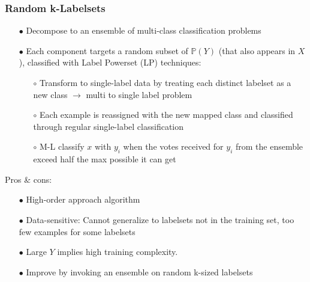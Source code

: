 \documentclass{beamer}
\begin{document}
\begin{frame}
\frametitle{Random k-Labelsets}
\begin{itemize}
\item[$\bullet$] Decompose to an ensemble of multi-class classification problems
\item[$\bullet$] Each component targets a random subset of $\mathbb{P}(Y)$ (that
  also appears in $X$), classified with Label Powerset (LP) techniques:
\begin{itemize}
\item[$\circ$] Transform to single-label data by treating each distinct labelset
  as a new class $\rightarrow$ multi to single label problem
\item[$\circ$] Each example is reassigned with the new mapped class and classified through regular single-label classification
\item[$\circ$] M-L classify $x$ with $y_i$ when the votes received for $y_i$ from the ensemble exceed half the max possible it can get
\end{itemize}
\end{itemize}
Pros \& cons:
\begin{itemize}
\item[$\bullet$] High-order approach algorithm
\item[$\bullet$] Data-sensitive: Cannot generalize to labelsets not in the training set, too few examples for some labelsets
\item[$\bullet$] Large $Y$ implies high training complexity.
\item[$\bullet$] Improve by invoking an ensemble on random k-sized labelsets
\end{itemize}
\end{frame}
\end{document}
